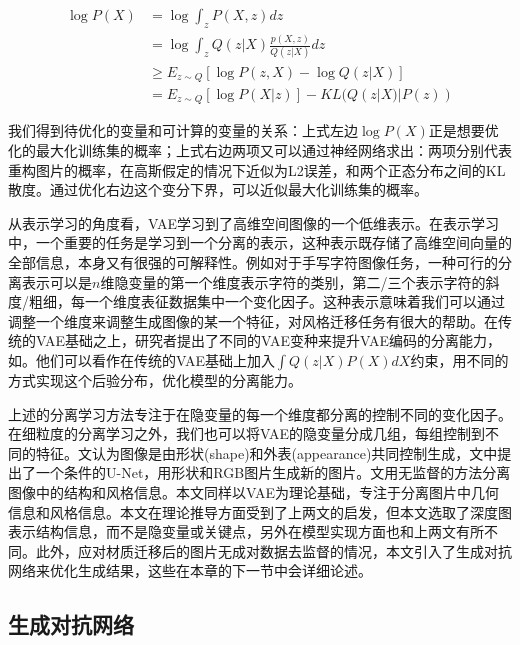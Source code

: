 \documentclass[UTF8,openany,AutoFakeBold,AutoFakeSlant,cs4size]{ctexbook}
\begin{document}
\begin{equation}
	\begin{aligned}
		\log P(X) &= \log \int_{z} P(X, z) dz \\
		&= \log \int_{z} Q(z | X)\frac{p(X, z)}{Q(z | X)} dz \\
		&\geq  E_{z \sim Q}[\log P(z, X) - \log Q(z|X)] \\
		&= E_{z \sim Q}[\log P(X|z)] - KL(Q(z|X) | P(z))
	\end{aligned}
\end{equation}

我们得到待优化的变量和可计算的变量的关系：上式左边$\log P(X)$正是想要优化的最大化训练集的概率；上式右边两项又可以通过神经网络求出：两项分别代表重构图片的概率，在高斯假定的情况下近似为L2误差，和两个正态分布之间的KL散度。通过优化右边这个变分下界，可以近似最大化训练集的概率。

从表示学习的角度看，VAE学习到了高维空间图像的一个低维表示。在表示学习中，一个重要的任务是学习到一个分离的表示，这种表示既存储了高维空间向量的全部信息，本身又有很强的可解释性。例如对于手写字符图像任务，一种可行的分离表示可以是$n$维隐变量的第一个维度表示字符的类别，第二/三个表示字符的斜度/粗细，每一个维度表征数据集中一个变化因子。这种表示意味着我们可以通过调整一个维度来调整生成图像的某一个特征，对风格迁移任务有很大的帮助。在传统的VAE基础之上，研究者提出了不同的VAE变种来提升VAE编码的分离能力，如\cite{Burgess2018UnderstandingDI, RubSchTol18b}。他们可以看作在传统的VAE基础上加入$\int Q(z|X) P(X) dX$约束，用不同的方式实现这个后验分布，优化模型的分离能力。

上述的分离学习方法专注于在隐变量的每一个维度都分离的控制不同的变化因子。在细粒度的分离学习之外，我们也可以将VAE的隐变量分成几组，每组控制到不同的特征。\cite{vunet2018}文认为图像是由形状(shape)和外表(appearance)共同控制生成，文中提出了一个条件的U-Net，用形状和RGB图片生成新的图片。\cite{Wu2019DisentanglingCA}文用无监督的方法分离图像中的结构和风格信息。本文同样以VAE为理论基础，专注于分离图片中几何信息和风格信息。本文在理论推导方面受到了上两文的启发，但本文选取了深度图表示结构信息，而不是隐变量\cite{vunet2018}或关键点\cite{Wu2019DisentanglingCA}，另外在模型实现方面也和上两文有所不同。此外，应对材质迁移后的图片无成对数据去监督的情况，本文引入了生成对抗网络来优化生成结果，这些在本章的下一节中会详细论述。

\subsection{生成对抗网络}
\end{document}
